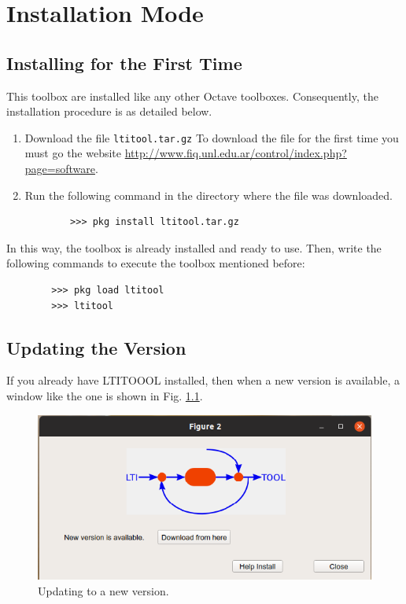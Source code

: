 \chapter{Installation Mode} \label{Install_chapter}



\section{Installing for the First Time}
This toolbox are installed like any other Octave toolboxes. Consequently, the installation procedure is as detailed below.

\begin{enumerate}
	\item[\textbf{Step 1.}] Download the file \texttt{ltitool.tar.gz} To download the file for the first time you must go the website  \url{http://www.fiq.unl.edu.ar/control/index.php?page=software}.
	\item[\textbf{Step 2.}] Run the following command in the directory where the file was downloaded.
	\begin{verbatim}
		>>> pkg install ltitool.tar.gz
	\end{verbatim}
\end{enumerate}

In this way, the toolbox is already installed and ready to use. Then, write the following commands to execute the toolbox mentioned before:
	\begin{verbatim}
		>>> pkg load ltitool
		>>> ltitool
	\end{verbatim}

\section{Updating the Version}

If you already have LTITOOOL installed, then when a new version is available, a window like the one is shown in Fig. \ref{chp_install_fig01}.

\begin{figure}[H]
	\centering
	\includegraphics[scale=0.58]{./figuras/chapter_install/ltitoolNewVersionWnd.png}
	\caption{Updating to a new version.}
	\label{chp_install_fig01}
\end{figure}



